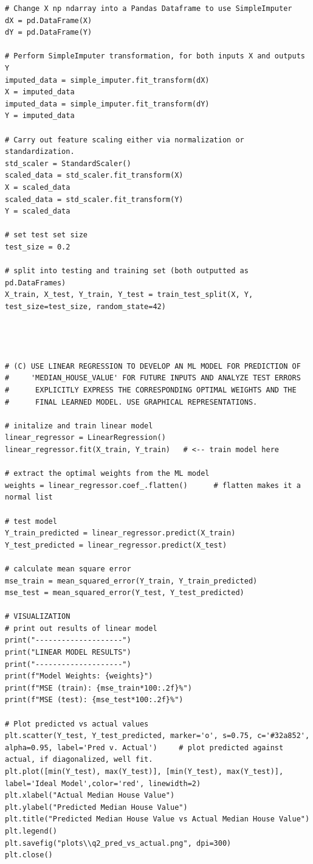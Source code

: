 \documentclass[11pt]{article}
\begin{document}
\begin{lstlisting}
# Change X np ndarray into a Pandas Dataframe to use SimpleImputer
dX = pd.DataFrame(X)
dY = pd.DataFrame(Y)

# Perform SimpleImputer transformation, for both inputs X and outputs Y
imputed_data = simple_imputer.fit_transform(dX)
X = imputed_data
imputed_data = simple_imputer.fit_transform(dY)
Y = imputed_data

# Carry out feature scaling either via normalization or standardization.
std_scaler = StandardScaler()
scaled_data = std_scaler.fit_transform(X)
X = scaled_data
scaled_data = std_scaler.fit_transform(Y)
Y = scaled_data

# set test set size
test_size = 0.2

# split into testing and training set (both outputted as pd.DataFrames)
X_train, X_test, Y_train, Y_test = train_test_split(X, Y, test_size=test_size, random_state=42)




# (C) USE LINEAR REGRESSION TO DEVELOP AN ML MODEL FOR PREDICTION OF
#     'MEDIAN_HOUSE_VALUE' FOR FUTURE INPUTS AND ANALYZE TEST ERRORS
#      EXPLICITLY EXPRESS THE CORRESPONDING OPTIMAL WEIGHTS AND THE
#      FINAL LEARNED MODEL. USE GRAPHICAL REPRESENTATIONS.

# initalize and train linear model
linear_regressor = LinearRegression()
linear_regressor.fit(X_train, Y_train)   # <-- train model here

# extract the optimal weights from the ML model
weights = linear_regressor.coef_.flatten()      # flatten makes it a normal list

# test model 
Y_train_predicted = linear_regressor.predict(X_train)
Y_test_predicted = linear_regressor.predict(X_test)

# calculate mean square error
mse_train = mean_squared_error(Y_train, Y_train_predicted)
mse_test = mean_squared_error(Y_test, Y_test_predicted)

# VISUALIZATION
# print out results of linear model
print("--------------------")
print("LINEAR MODEL RESULTS")
print("--------------------")
print(f"Model Weights: {weights}")
print(f"MSE (train): {mse_train*100:.2f}%")
print(f"MSE (test): {mse_test*100:.2f}%")

# Plot predicted vs actual values
plt.scatter(Y_test, Y_test_predicted, marker='o', s=0.75, c='#32a852', alpha=0.95, label='Pred v. Actual')     # plot predicted against actual, if diagonalized, well fit.
plt.plot([min(Y_test), max(Y_test)], [min(Y_test), max(Y_test)], label='Ideal Model',color='red', linewidth=2)
plt.xlabel("Actual Median House Value")
plt.ylabel("Predicted Median House Value")
plt.title("Predicted Median House Value vs Actual Median House Value")
plt.legend()
plt.savefig("plots\\q2_pred_vs_actual.png", dpi=300)
plt.close()


\end{lstlisting}
\end{document}
